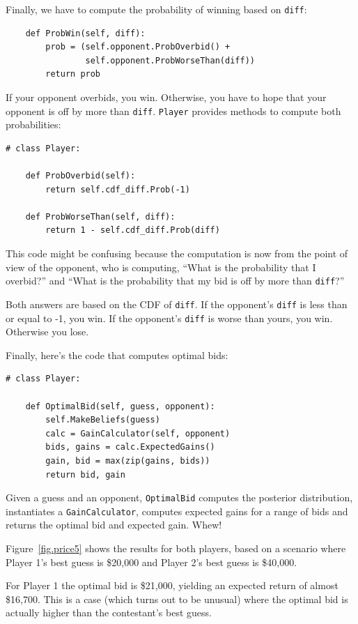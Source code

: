 \documentclass[12pt]{book}
\begin{document}
Finally, we have to compute the probability of winning based
on {\tt diff}:

\begin{verbatim}
    def ProbWin(self, diff):
        prob = (self.opponent.ProbOverbid() + 
                self.opponent.ProbWorseThan(diff))
        return prob
\end{verbatim}

If your opponent overbids, you win.  Otherwise, you have to hope
that your opponent is off by more than {\tt diff}.  {\tt Player}
provides methods to compute both probabilities:

\begin{verbatim}
# class Player:

    def ProbOverbid(self):
        return self.cdf_diff.Prob(-1)

    def ProbWorseThan(self, diff):
        return 1 - self.cdf_diff.Prob(diff)
\end{verbatim}

This code might be confusing because the computation is now from
the point of view of the opponent, who is computing, ``What is
the probability that I overbid?'' and ``What is the probability
that my bid is off by more than {\tt diff}?''

Both answers are based on the CDF of {\tt diff}.  If the opponent's
{\tt diff} is less than or equal to -1, you win.  If the opponent's
{\tt diff} is worse than yours, you win.  Otherwise you lose.

Finally, here's the code that computes optimal bids:

\begin{verbatim}
# class Player:

    def OptimalBid(self, guess, opponent):
        self.MakeBeliefs(guess)
        calc = GainCalculator(self, opponent)
        bids, gains = calc.ExpectedGains()
        gain, bid = max(zip(gains, bids))
        return bid, gain
\end{verbatim}

Given a guess and an opponent, {\tt OptimalBid} computes
the posterior distribution, instantiates a {\tt GainCalculator},
computes expected gains for a range of bids and returns
the optimal bid and expected gain.  Whew!

Figure~\ref{fig.price5} shows the results for both players,
based on a scenario where Player 1's best guess is \$20,000
and Player 2's best guess is \$40,000.

For Player 1 the optimal bid is \$21,000, yielding an expected
return of almost \$16,700.  This is a case (which turns out
to be unusual) where the optimal bid is actually higher than
the contestant's best guess.
\end{document}
